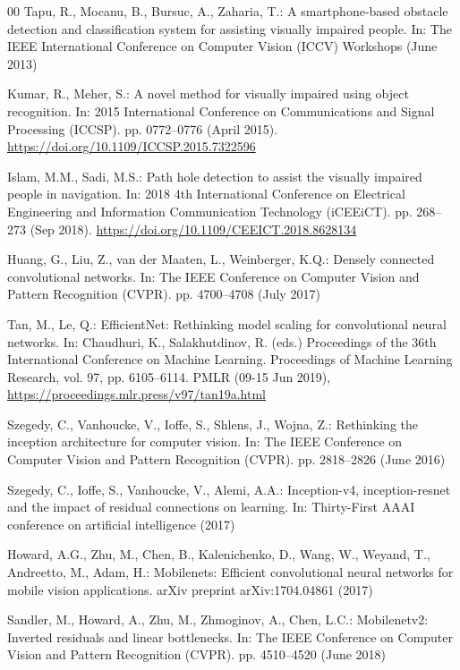 \documentclass[preprint,12pt]{elsarticle}
\begin{document}
\begin{thebibliography}{00}
Tapu, R., Mocanu, B., Bursuc, A., Zaharia, T.: A smartphone-based obstacle detection and classification system for assisting visually impaired people. In: The IEEE International Conference on Computer Vision (ICCV) Workshops (June 2013)

Kumar, R., Meher, S.: A novel method for visually impaired using object recognition. In: 2015 International Conference on Communications and Signal Processing (ICCSP). pp. 0772--0776 (April 2015). \url{https://doi.org/10.1109/ICCSP.2015.7322596}

Islam, M.M., Sadi, M.S.: Path hole detection to assist the visually impaired people in navigation. In: 2018 4th International Conference on Electrical Engineering and Information Communication Technology (iCEEiCT). pp. 268--273 (Sep 2018). \url{https://doi.org/10.1109/CEEICT.2018.8628134}

Huang, G., Liu, Z., van der Maaten, L., Weinberger, K.Q.: Densely connected convolutional networks. In: The IEEE Conference on Computer Vision and Pattern Recognition (CVPR). pp. 4700--4708 (July 2017)

Tan, M., Le, Q.: EfficientNet: Rethinking model scaling for convolutional neural networks. In: Chaudhuri, K., Salakhutdinov, R. (eds.) Proceedings of the 36th International Conference on Machine Learning. Proceedings of Machine Learning Research, vol. 97, pp. 6105--6114. PMLR (09-15 Jun 2019), \url{https://proceedings.mlr.press/v97/tan19a.html}

Szegedy, C., Vanhoucke, V., Ioffe, S., Shlens, J., Wojna, Z.: Rethinking the inception architecture for computer vision. In: The IEEE Conference on Computer Vision and Pattern Recognition (CVPR). pp. 2818--2826 (June 2016) 

Szegedy, C., Ioffe, S., Vanhoucke, V., Alemi, A.A.: Inception-v4, inception-resnet and the impact of residual connections on learning. In: Thirty-First AAAI conference on artificial intelligence (2017)

Howard, A.G., Zhu, M., Chen, B., Kalenichenko, D., Wang, W., Weyand, T., Andreetto, M., Adam, H.: Mobilenets: Efficient convolutional neural networks for mobile vision applications. arXiv preprint arXiv:1704.04861 (2017)

Sandler, M., Howard, A., Zhu, M., Zhmoginov, A., Chen, L.C.: Mobilenetv2: Inverted residuals and linear bottlenecks. In: The IEEE Conference on Computer Vision and Pattern Recognition (CVPR). pp. 4510--4520 (June 2018)


\end{thebibliography}
\end{document}
